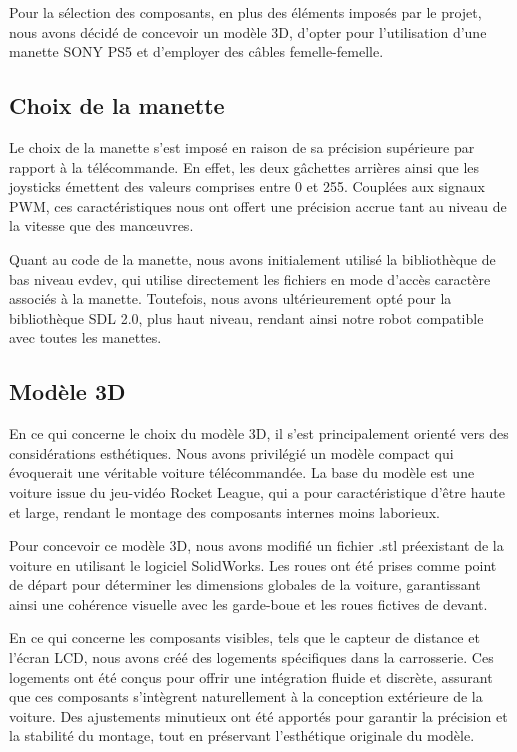 Pour la sélection des composants, en plus des éléments imposés par le projet, nous avons décidé de concevoir un modèle 3D, d'opter pour l'utilisation d'une manette SONY PS5 et d'employer des câbles femelle-femelle.

\subsection{Choix de la manette}
Le choix de la manette s'est imposé en raison de sa précision supérieure par rapport à la télécommande. En effet, les deux gâchettes arrières ainsi que les joysticks émettent des valeurs comprises entre 0 et 255. Couplées aux signaux PWM, ces caractéristiques nous ont offert une précision accrue tant au niveau de la vitesse que des manœuvres.

Quant au code de la manette, nous avons initialement utilisé la bibliothèque de bas niveau evdev, qui utilise directement les fichiers en mode d'accès caractère associés à la manette. Toutefois, nous avons ultérieurement opté pour la bibliothèque SDL 2.0, plus haut niveau, rendant ainsi notre robot compatible avec toutes les manettes.

\subsection{Modèle 3D}
En ce qui concerne le choix du modèle 3D, il s'est principalement orienté vers des considérations esthétiques. Nous avons privilégié un modèle compact qui évoquerait une véritable voiture télécommandée. La base du modèle est une voiture issue du jeu-vidéo Rocket League, qui a pour caractéristique d'être haute et large, rendant le montage des composants internes moins laborieux.

Pour concevoir ce modèle 3D, nous avons modifié un fichier .stl préexistant de la voiture en utilisant le logiciel SolidWorks. Les roues ont été prises comme point de départ pour déterminer les dimensions globales de la voiture, garantissant ainsi une cohérence visuelle avec les garde-boue et les roues fictives de devant. 

En ce qui concerne les composants visibles, tels que le capteur de distance et l'écran LCD, nous avons créé des logements spécifiques dans la carrosserie. Ces logements ont été conçus pour offrir une intégration fluide et discrète, assurant que ces composants s'intègrent naturellement à la conception extérieure de la voiture. Des ajustements minutieux ont été apportés pour garantir la précision et la stabilité du montage, tout en préservant l'esthétique originale du modèle.

